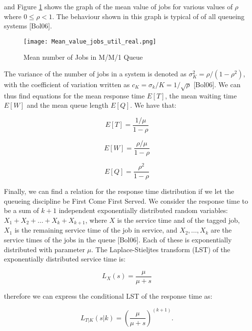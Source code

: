 \documentclass[a4paper,11pt,titlepage]{article}
\begin{document}
and Figure \ref{fig:mean_value_jobs_graph} shows the graph of the mean value of jobs for various values of $\rho$ where $0 \leq \rho < 1$. The behaviour shown in this graph is typical of of all queueing systems [Bol06]. 

\begin{figure}[h!]
\begin{center}
\texttt{[image: Mean\_value\_jobs\_util\_real.png]}
\caption{Mean number of Jobs in M/M/1 Queue}
\label{fig:mean_value_jobs_graph}
\end{center}
\end{figure}

The variance of the number of jobs in a system is denoted as $\sigma_K^2 = \rho/(1-\rho^2)$, with the coefficient of variation written as $c_K = \sigma_k / K = 1/\sqrt{\rho}$ [Bol06]. We can thus find equations for the mean response time $E[T]$, the mean waiting time $E[W]$ and the mean queue length $E[Q]$. We have that: 

\begin{equation}
    E[T] = \frac{1/\mu}{1-\rho}
\end{equation}

\begin{equation}
    E[W] = \frac{\rho/\mu}{1-\rho}
\end{equation}

\begin{equation}
    E[Q] = \frac{\rho^2}{1-\rho}
\end{equation}

Finally, we can find a relation for the response time distribution if we let the queueing discipline be First Come First Served. We consider the response time to be a sum of $k+1$ independent exponentially distributed random variables: $X_1 + X_2 + ... +X_k + X_{k+1}$, where $X$ is the service time and of the tagged job, $X_1$ is the remaining service time of the job in service, and $X_2, ..., X_k$ are the service times of the jobs in the queue [Bol06]. Each of these is exponentially distributed with parameter $\mu$. The Laplace-Stieljtes transform (LST) of the exponentially distributed service time is: 

\begin{equation}
    L_X(s) = \frac{\mu}{\mu + s}
\end{equation}

therefore we can express the conditional LST of the response time as: 

\begin{equation}
    L_{T|K}(s|k) = \left(\frac{\mu}{\mu + s} \right)^{(k+1)} .
\end{equation}
\end{document}
